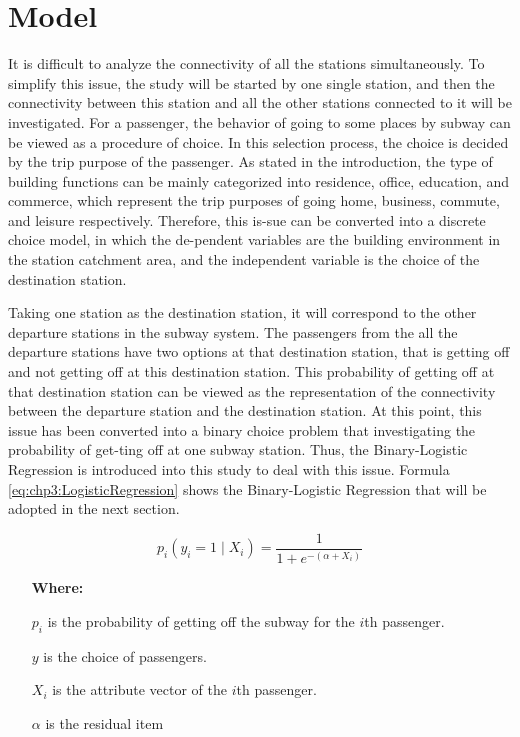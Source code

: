 \section{Model}
\indent

%
It is difficult to analyze the connectivity of all the stations simultaneously. To simplify this issue, the study will be started by one single station, and then the connectivity between this station and all the other stations connected to it will be investigated. For a passenger, the behavior of going to some places by subway can be viewed as a procedure of choice. In this selection process, the choice is decided by the trip purpose of the passenger. As stated in the introduction, the type of building functions can be mainly categorized into residence, office, education, and commerce, which represent the trip purposes of going home, business, commute, and leisure respectively. Therefore, this is-sue can be converted into a discrete choice model, in which the de-pendent variables are the building environment in the station catchment area, and the independent variable is the choice of the destination station.

%
Taking one station as the destination station, it will correspond to the other departure stations in the subway system. The passengers from the all the departure stations have two options at that destination station, that is getting off and not getting off at this destination station. This probability of getting off at that destination station can be viewed as the representation of the connectivity between the departure station and the destination station. At this point, this issue has been converted into a binary choice problem that investigating the probability of get-ting off at one subway station. Thus, the Binary-Logistic Regression is introduced into this study to deal with this issue. Formula \ref{eq:chp3:LogisticRegression} shows the Binary-Logistic Regression that will be adopted in the next section.

\begin{equation}
	p_i(y_i=1 \mid X_i)=\frac{1}{1+e^{-(\alpha +X_i)}}
	\label{eq:chp3:LogisticRegression}
\end{equation}

\begin{enumerate}
	\item[\textbf{Where:}]
	\item[$p_i$] is the probability of getting off the subway for the $i$th passenger.
	\item[$y$] is the choice of passengers.
	\item[$X_i$] is the attribute vector of the $i$th passenger.
	\item[$\alpha$] is the residual item
\end{enumerate}

